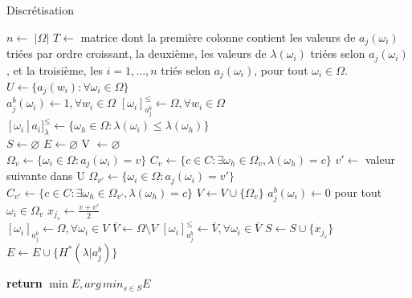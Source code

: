 \documentclass[a4paper]{article}
\begin{document}
\begin{algorithm}[H]
\caption{Discrétisation}
\label{alg:discretize}
\begin{algorithmic}
\State {}
\State {}
\State {}

\State $n\gets$ $| \Omega |$ 
\State $T \gets $ matrice dont la première colonne contient les valeurs de $a_j(\omega_i)$ triées par ordre croissant, la deuxième, les valeurs de $\lambda(\omega_i)$ triées selon $a_j(\omega_i)$, et la troisième, les $i=1,...,n$ triés selon $a_j(\omega_i)$, pour tout $\omega_i \in \Omega$.
\State $U\gets \{a_j(w_i) : \forall \omega_i \in \Omega\}$  \\

\State $a^{b}_j(\omega_i) \gets 1, \forall w_i \in \Omega$ 
\State $[\omega_i]^{\leq}_{a^{b}_j} \gets \Omega, \forall w_i \in \Omega$ 
\State $[\omega_i]a_i]^{\leq}_{\lambda} \gets \{\omega_h \in \Omega : \lambda(\omega_i) \leq \lambda(\omega_h)\}$ \\

\State $S \gets \varnothing $ 
\State $E \gets \varnothing $ 
\State V $\gets \varnothing $  \\

 
    \State $\Omega_{v} \gets \{\omega_i \in \Omega : a_j(\omega_i) = v\}$
    \State $C_{v} \gets \{c \in C : \exists \omega_h \in \Omega_{v}, \lambda(\omega_h) = c\}$
    \State $v' \gets$ valeur suivante dans U
    \State $\Omega_{v'} \gets \{\omega_i \in \Omega : a_j(\omega_i) = v'\}$
    \State $C_{v'} \gets \{c \in C : \exists \omega_h \in \Omega_{v'}, \lambda(\omega_h) = c\}$
    \State $V \gets V \cup \{\Omega_{v}\}$    
    \State $a^{b}_j(\omega_i) \gets 0$ pour tout $\omega_i \in \Omega_{v}$ 
    \State $x_{j_s}\gets \frac{v + v'}{2}$\\
    
    	\State $[\omega_i]_{a^{b}_j} \gets \Omega, \forall \omega_i \in V$
        \State $\bar{V} \gets \Omega \setminus V$ 
        \State $[\omega_i]^{\leq}_{a^{b}_j} \gets \bar{V}, \forall \omega_i \in \bar{V}$
        \State $S \gets S \cup \{x_{j_s}\}$
        \State $E \gets E \cup \{H^*(\lambda | a^{b}_j)\}$
    \EndIf
\EndFor

\State \textbf{return} $\min E, arg\,min_{s \in S} E $ 
\EndProcedure
\end{algorithmic}
\end{algorithm}
\end{document}
